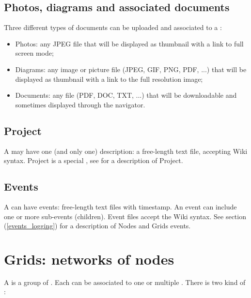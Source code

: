 \subsection{Photos, diagrams and associated documents}

Three different types of documents can be uploaded and associated to a :
\begin{itemize}
\item Photos: any JPEG file that will be displayed as thumbnail with a link to full screen mode;
\item Diagrams: any image or picture file (JPEG, GIF, PNG, PDF, ...) that will be displayed as thumbnail with a link to the full resolution image;
\item Documents: any file (PDF, DOC, TXT, ...) that will be downloadable and sometimes displayed through the navigator.
\end{itemize}


\subsection{Project}

A  may have one (and only one)  description: a free-length text file, accepting Wiki syntax. Project is a special , see  for
a description of Project.

\subsection{Events}

A  can have events:  free-length text files with timestamp. An event can include one or more sub-events (children).
Event files  accept the Wiki syntax. See  section (\ref{events_logging}) for a description of Nodes and Grids events.


\section{Grids: networks of nodes}
\label{grids}

A  is a group of . Each  can be associated to one or multiple . There is two kind of :

